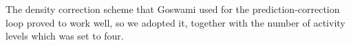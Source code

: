 \documentclass[../../main.tex]{subfiles}
\begin{document}
The density correction scheme that Goswami used for the prediction-correction loop proved to work well, so we adopted it, together with the number of activity levels which was set to four. 


\end{document}
